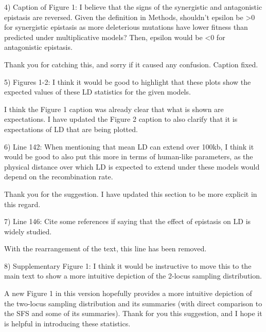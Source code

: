 \documentclass{article}
\newenvironment{response}%
  {\list{}{\leftmargin=0.5in\rightmargin=0.5in\color{blue}}\item[]}%
  {\endlist}
\begin{document}
4) Caption of Figure 1: I believe that the signs of the synergistic and
antagonistic epistasis are reversed. Given the definition in Methods, shouldn't
epsilon be >0 for synergistic epistasis as more deleterious mutations have
lower fitness than predicted under multiplicative models? Then, epsilon would
be <0 for antagonistic epistasis.

\begin{response}
    Thank you for catching this, and sorry if it caused any confusion. Caption fixed.
\end{response}

5) Figures 1-2: I think it would be good to highlight that these plots show the
expected values of these LD statistics for the given models.

\begin{response}
    I think the Figure 1 caption was already clear that what is shown are
    expectations. I have updated the Figure 2 caption to also clarify that
    it is expectations of LD that are being plotted.
\end{response}

6) Line 142: When mentioning that mean LD can extend over 100kb, I think it
would be good to also put this more in terms of human-like parameters, as the
physical distance over which LD is expected to extend under these models would
depend on the recombination rate.

\begin{response}
    Thank you for the suggestion. I have updated this section to be more explicit
    in this regard.
\end{response}

7) Line 146: Cite some references if saying that the effect of epistasis on LD
is widely studied.

\begin{response}
    With the rearrangement of the text, this line has been removed.
\end{response}

8) Supplementary Figure 1: I think it would be instructive to move this to the
main text to show a more intuitive depiction of the 2-locus sampling
distribution.

\begin{response}
    A new Figure 1 in this version hopefully provides a more intuitive depiction
    of the two-locus sampling distribution and its summaries (with direct comparison
    to the SFS and some of its summaries). Thank for you this suggestion, and I hope
    it is helpful in introducing these statistics.
\end{response}
\end{document}
